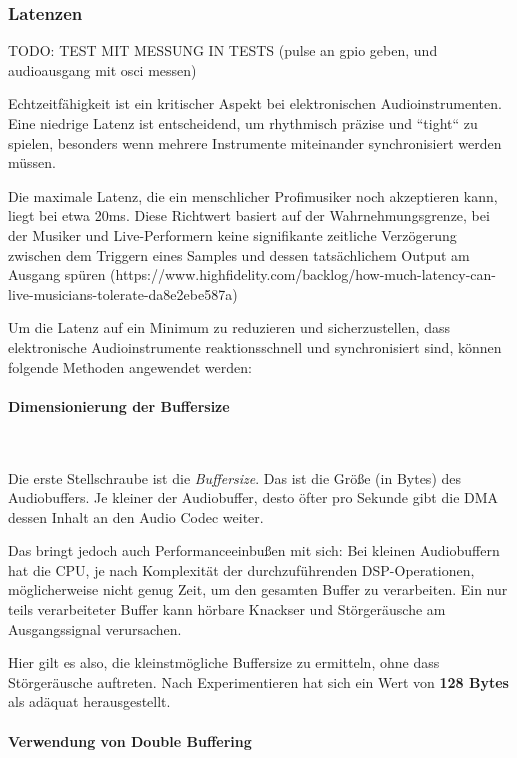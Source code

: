 \subsubsection{Latenzen}

TODO: TEST MIT MESSUNG IN TESTS (pulse an gpio geben, und audioausgang mit osci messen)

Echtzeitfähigkeit ist ein kritischer Aspekt bei elektronischen Audioinstrumenten. 
Eine niedrige Latenz ist entscheidend, um rhythmisch präzise und ``tight`` zu spielen, besonders wenn mehrere Instrumente miteinander synchronisiert werden müssen.

Die maximale Latenz, die ein menschlicher Profimusiker noch akzeptieren kann, liegt bei etwa 20ms. Diese Richtwert basiert auf der Wahrnehmungsgrenze, bei der Musiker und Live-Performern keine signifikante zeitliche Verzögerung zwischen dem Triggern eines Samples und dessen tatsächlichem Output am Ausgang spüren (https://www.highfidelity.com/backlog/how-much-latency-can-live-musicians-tolerate-da8e2ebe587a)

Um die Latenz auf ein Minimum zu reduzieren und sicherzustellen, dass elektronische Audioinstrumente reaktionsschnell und synchronisiert sind, können folgende Methoden angewendet werden:

\paragraph{Dimensionierung der Buffersize}\

Die erste Stellschraube ist die \textit{Buffersize}.
Das ist die Größe (in Bytes) des Audiobuffers.
Je kleiner der Audiobuffer, desto öfter pro Sekunde gibt die DMA dessen Inhalt an den Audio Codec weiter.

Das bringt jedoch auch Performanceeinbußen mit sich: Bei kleinen Audiobuffern hat die CPU, je nach Komplexität der durchzuführenden DSP-Operationen, möglicherweise nicht genug Zeit, um den gesamten Buffer zu verarbeiten.
Ein nur teils verarbeiteter Buffer kann hörbare Knackser und Störgeräusche am Ausgangssignal verursachen.

Hier gilt es also, die kleinstmögliche Buffersize zu ermitteln, ohne dass Störgeräusche auftreten.
Nach Experimentieren hat sich ein Wert von \textbf{128 Bytes} als adäquat herausgestellt.

\paragraph{Verwendung von Double Buffering}\

